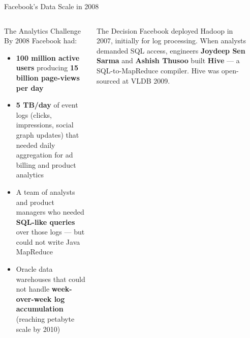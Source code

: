 \documentclass[aspectratio=169,10pt]{beamer}
\begin{document}
\begin{frame}{Facebook's Data Scale in 2008}
  \begin{columns}[T]
      \begin{block}{The Analytics Challenge}
        By 2008 Facebook had:
        \begin{itemize}
          \item \textbf{100 million active users} producing
                \textbf{15 billion page-views per day}
          \item \textbf{5 TB/day} of event logs (clicks, impressions,
                social graph updates) that needed daily aggregation
                for ad billing and product analytics
          \item A team of analysts and product managers who needed
                \textbf{SQL-like queries} over those logs —
                but could not write Java MapReduce
          \item Oracle data warehouses that could not handle
                \textbf{week-over-week log accumulation}
                (reaching petabyte scale by 2010)
        \end{itemize}
      \end{block}
      \vspace{4pt}
      \begin{exampleblock}{The Decision}
        Facebook deployed Hadoop in 2007, initially for log processing.
        When analysts demanded SQL access, engineers
        \textbf{Joydeep Sen Sarma} and \textbf{Ashish Thusoo}
        built \textbf{Hive} — a SQL-to-MapReduce compiler.
        Hive was open-sourced at VLDB 2009.
      \end{exampleblock}

      \begin{center}
\end{center}
\end{columns}
\end{frame}
\end{document}
